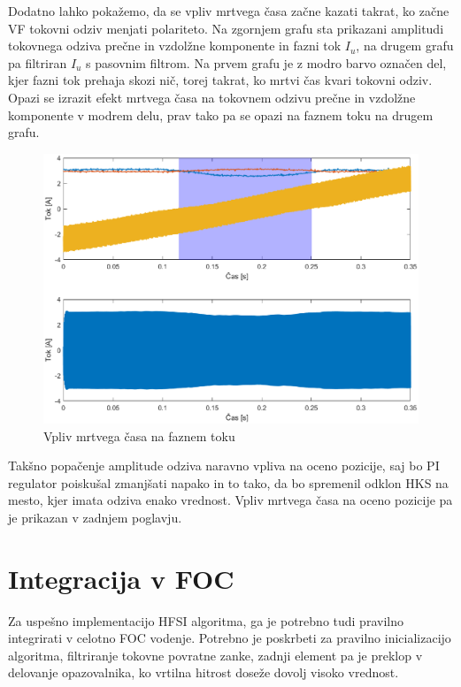 \documentclass[a4paper,twoside,openright,12pt,slovene]{book}
\begin{document}
Dodatno lahko pokažemo, da se vpliv mrtvega časa začne kazati takrat, ko začne VF tokovni odziv menjati polariteto. Na zgornjem grafu sta prikazani amplitudi tokovnega odziva prečne in vzdolžne
komponente in fazni tok $I_u$, na drugem grafu pa filtriran $I_u$ s pasovnim filtrom. Na prvem grafu je z modro barvo označen del, kjer fazni tok prehaja skozi nič, torej takrat, ko mrtvi čas kvari
tokovni odziv. Opazi se izrazit efekt mrtvega časa na tokovnem odzivu prečne in vzdolžne komponente v modrem delu, prav tako pa se opazi na faznem toku na drugem grafu.

\begin{figure}[!htbp]
    \centering
    \includegraphics[width=1\columnwidth]{Slike/mrtviCasFazniTok.eps}
    \caption{\label{mrtviCasFazniTok} Vpliv mrtvega časa na faznem toku }
\end{figure}


Takšno popačenje amplitude odziva naravno vpliva na oceno pozicije, saj bo PI regulator poiskušal zmanjšati napako in to tako, da bo spremenil odklon HKS na mesto, kjer imata odziva enako vrednost.
Vpliv mrtvega časa na oceno pozicije pa je prikazan v zadnjem poglavju.

\chapter{Integracija v FOC} \label{integracija}

Za uspešno implementacijo HFSI algoritma, ga je potrebno tudi pravilno integrirati v celotno FOC vodenje. Potrebno je poskrbeti za pravilno inicializacijo algoritma, filtriranje tokovne povratne
zanke, zadnji element pa je preklop v delovanje opazovalnika, ko vrtilna hitrost doseže dovolj visoko vrednost.
\end{document}
